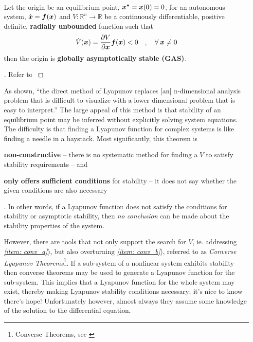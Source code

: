 \documentclass[12pt]{ucthesis}
\begin{document}
\begin{thm_contd}[\ref*{thm: lyapunov}] \alignright \citet[Thm. 3.2]{Khalil1996} \\
	Let the origin be an equilibrium point, $\boldsymbol{x^*}=\boldsymbol{x}(0)=0$, for an autonomous system, $\dot{\boldsymbol{x}} = \boldsymbol{f}(\boldsymbol{x})$ and $V:\mathbb{R}^n \rightarrow \mathbb{R}$ be a continuously differentiable, positive definite, \textbf{radially unbounded} function such that
		\begin{align}
			\dot{V}(\boldsymbol{x}) = \frac{\partial V}{\partial\boldsymbol{x}} \boldsymbol{f}(\boldsymbol{x}) < 0 \quad,\quad \forall \: \boldsymbol{x} \neq 0
			\label{eq: lyapunov_gas}
		\end{align}
	then the origin is \textbf{globally asymptotically stable (GAS)}.
\end{thm_contd}

\begin{proof}[]
	Refer to \citet[Pg. 111]{Khalil1996}
\end{proof}

As shown, ``the direct method of Lyapunov replaces [an] n-dimensional analysis problem that is difficult to visualize with a lower dimensional problem that is easy to interpret.'' \cite{Farrell2006} The large appeal of this method is that stability of an equilibrium point may be inferred without explicitly solving system equations. The difficulty is that finding a Lyapunov function for complex systems is like finding a needle in a haystack. Most significantly, this theorem is \begin{inparaenum} \item{\label{item: conv_a} \textbf{non-constructive} -- there is no systematic method for finding a $V$ to satisfy stability requirements -- and} \item{\label{item: conv_b} \textbf{only offers sufficient conditions} for stability -- it does not say whether the given conditions are also necessary}\end{inparaenum}. In other words, if a Lyapunov function does not satisfy the conditions for stability or asymptotic stability, then \textit{no conclusion} can be made about the stability properties of the system. 

However, there are tools that not only support the search for $V$, ie. addressing \textit{\ref{item: conv_a}}), but also overturning \textit{\ref{item: conv_b}}), referred to as \textit{Converse Lyapunov Theorems}\footnote{Converse Theorems, see \citet[Sec. 3.6]{Khalil1996}}. If a sub-system of a nonlinear system exhibits stability then converse theorems may be used to generate a Lyapunov function for the sub-system. This implies that a Lyapunov function for the whole system may exist, thereby making Lyapunov stability conditions necessary; it's nice to know there's hope! Unfortunately however, almost always they assume some knowledge of the solution to the differential equation. %
\end{document}
